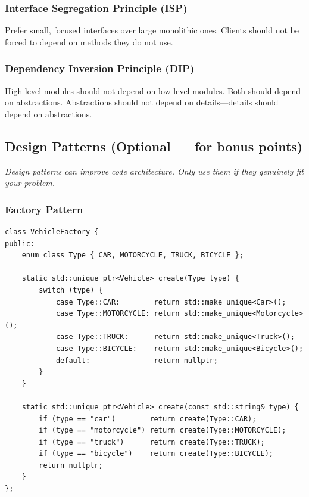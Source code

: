 \subsubsection{Interface Segregation Principle (ISP)}

Prefer small, focused interfaces over large monolithic ones. Clients should not be forced to depend on methods they do not use.

\subsubsection{Dependency Inversion Principle (DIP)}

High-level modules should not depend on low-level modules. Both should depend on abstractions. Abstractions should not depend on details---details should depend on abstractions.

\subsection{Design Patterns (Optional --- for bonus points)}

\textit{Design patterns can improve code architecture. Only use them if they genuinely fit your problem.}

\subsubsection{Factory Pattern}

\begin{lstlisting}[style=cpp]
class VehicleFactory {
public:
    enum class Type { CAR, MOTORCYCLE, TRUCK, BICYCLE };

    static std::unique_ptr<Vehicle> create(Type type) {
        switch (type) {
            case Type::CAR:        return std::make_unique<Car>();
            case Type::MOTORCYCLE: return std::make_unique<Motorcycle>();
            case Type::TRUCK:      return std::make_unique<Truck>();
            case Type::BICYCLE:    return std::make_unique<Bicycle>();
            default:               return nullptr;
        }
    }

    static std::unique_ptr<Vehicle> create(const std::string& type) {
        if (type == "car")        return create(Type::CAR);
        if (type == "motorcycle") return create(Type::MOTORCYCLE);
        if (type == "truck")      return create(Type::TRUCK);
        if (type == "bicycle")    return create(Type::BICYCLE);
        return nullptr;
    }
};
\end{lstlisting}

